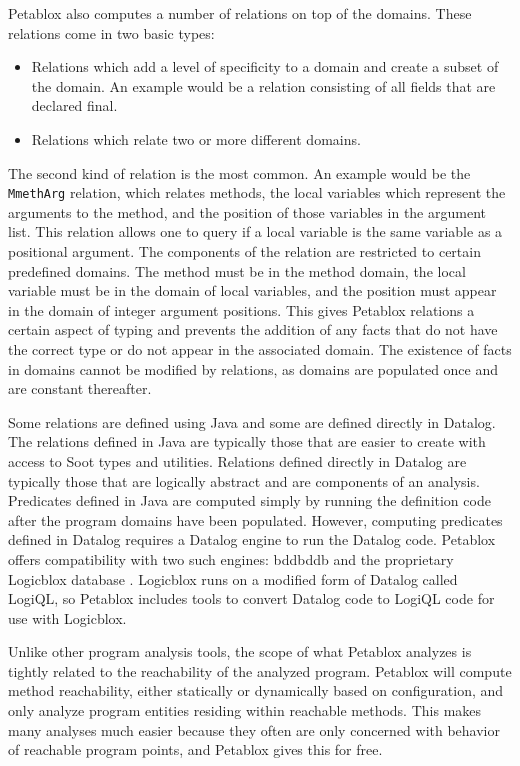 Petablox also computes a number of relations on top of the domains. These relations come in two basic types:

\begin{itemize}
  \item Relations which add a level of specificity to a domain and create a subset of the domain. An example would be a relation consisting of all fields that are declared final.
  \item Relations which relate two or more different domains.
\end{itemize}

The second kind of relation is the most common. An example would be the \texttt{MmethArg} relation, which relates methods, the local variables which represent the arguments to the method, and the position of those variables in the argument list. This relation allows one to query if a local variable is the same variable as a positional argument. The components of the relation are restricted to certain predefined domains. The method must be in the method domain, the local variable must be in the domain of local variables, and the position must appear in the domain of integer argument positions. This gives Petablox relations a certain aspect of typing and prevents the addition of any facts that do not have the correct type or do not appear in the associated domain. The existence of facts in domains cannot be modified by relations, as domains are populated once and are constant thereafter. 

Some relations are defined using Java and some are defined directly in Datalog. The relations defined in Java are typically those that are easier to create with access to Soot types and utilities. Relations defined directly in Datalog are typically those that are logically abstract and are components of an analysis. Predicates defined in Java are computed simply by running the definition code after the program domains have been populated. However, computing predicates defined in Datalog requires a Datalog engine to run the Datalog code. Petablox offers compatibility with two such engines: bddbddb \cite{bddbddb} and the proprietary Logicblox database \cite{logicblox}. Logicblox runs on a modified form of Datalog called LogiQL, so Petablox includes tools to convert Datalog code to LogiQL code for use with Logicblox.

Unlike other program analysis tools, the scope of what Petablox analyzes is tightly related to the reachability of the analyzed program. Petablox will compute method reachability, either statically or dynamically based on configuration, and only analyze program entities residing within reachable methods. This makes many analyses much easier because they often are only concerned with behavior of reachable program points, and Petablox gives this for free.

